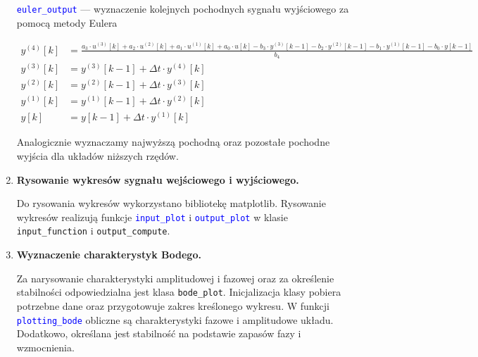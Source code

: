 \documentclass[10pt, a4paper]{article}
\begin{document}
\begin{enumerate}[label=\alph*.]
\vspace{0.1cm}

\textcolor{blue}{\texttt{euler\_output}} --- wyznaczenie kolejnych pochodnych sygnału wyjściowego za pomocą metody Eulera

{\footnotesize
\begin{align*}
y^{(4)}[k] &= \frac{a_3 \cdot u^{(3)}[k] + a_2 \cdot u^{(2)}[k] + a_1 \cdot u^{(1)}[k] + a_0 \cdot u[k] - b_3 \cdot y^{(3)}[k-1] - b_2 \cdot y^{(2)}[k-1] - b_1 \cdot y^{(1)}[k-1] - b_0 \cdot y[k-1]}{b_4} \\
y^{(3)}[k] &= y^{(3)}[k-1] + \Delta t \cdot y^{(4)}[k] \\
y^{(2)}[k] &= y^{(2)}[k-1] + \Delta t \cdot y^{(3)}[k] \\
y^{(1)}[k] &= y^{(1)}[k-1] + \Delta t \cdot y^{(2)}[k] \\
y[k] &= y[k-1] + \Delta t \cdot y^{(1)}[k]
\end{align*}
}

Analogicznie wyznaczamy najwyższą pochodną oraz pozostałe pochodne wyjścia dla układów niższych rzędów.

  \vspace{0.2cm}

  \item \textbf{Rysowanie wykresów sygnału wejściowego i wyjściowego.} \par\vspace{0.1cm}
  Do rysowania wykresów wykorzystano bibliotekę matplotlib. Rysowanie wykresów realizują funkcje \textcolor{blue}{\texttt{input\_plot}} i \textcolor{blue}{\texttt{output\_plot}}
  w klasie {\texttt{input\_function}} i {\texttt{output\_compute}}.

  \vspace{0.2cm}
  
  \item \textbf{Wyznaczenie charakterystyk Bodego.} \par\vspace{0.1cm}
    Za narysowanie charakterystyki amplitudowej i fazowej oraz za określenie stabilności
    odpowiedzialna jest klasa {\texttt{bode\_plot}}. Inicjalizacja klasy pobiera potrzebne dane
    oraz przygotowuje zakres kreślonego wykresu. W funkcji \textcolor{blue}{\texttt{plotting\_bode}} obliczne są charakterystyki fazowe i amplitudowe
    układu. Dodatkowo, określana jest stabilność na podstawie zapasów fazy i wzmocnienia.
  \vspace{0.2cm}


\end{enumerate}
\end{document}

